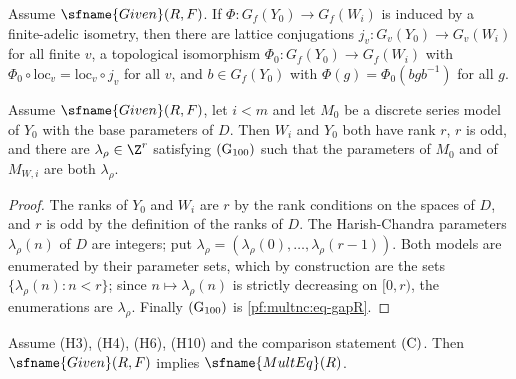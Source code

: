 \begin{lemma}\label{pf:multnc:localiso}
Assume $\sfname{Given}(R,F)$. If $\Phi\colon G_f(Y_0)\to G_f(W_i)$ is induced by a finite-adelic isometry, then there are
lattice conjugations $j_v\colon G_v(Y_0)\to G_v(W_i)$ for all finite $v$, a topological isomorphism
$\Phi_0\colon G_f(Y_0)\to G_f(W_i)$ with $\Phi_0\circ\mathrm{loc}_v=\mathrm{loc}_v\circ j_v$ for all $v$, and $b\in
G_f(Y_0)$ with $\Phi(g)=\Phi_0(bgb^{-1})$ for all $g$.
\end{lemma}

\begin{lemma}\label{pf:multnc:params}
Assume $\sfname{Given}(R,F)$, let $i<m$ and let $M_0$ be a discrete series model of $Y_0$ with the base parameters of $D$.
Then $W_i$ and $Y_0$ both have rank $r$, $r$ is odd, and there are $\lambda_\rho\in\Z^r$ satisfying
$\textup{(G$_{100}$)}$ such that the parameters of $M_0$ and of $M_{W,i}$ are both $\lambda_\rho$.
\end{lemma}

\begin{proof}
The ranks of $Y_0$ and $W_i$ are $r$ by the rank conditions on the spaces of $D$, and $r$ is odd by the definition of the
ranks of $D$. The Harish-Chandra parameters $\lambda_\rho(n)$ of $D$ are integers; put
$\lambda_\rho=(\lambda_\rho(0),\dots,\lambda_\rho(r-1))$. Both models are enumerated by their parameter sets, which by
construction are the sets $\{\lambda_\rho(n):n<r\}$; since $n\mapsto\lambda_\rho(n)$ is strictly decreasing on $[0,r)$,
the enumerations are $\lambda_\rho$. Finally $\textup{(G$_{100}$)}$ is \eqref{pf:multnc:eq-gapR}.
\end{proof}

\begin{proposition}\label{pf:multnc:multeq-of-trcusp}
Assume (H3), (H4), (H6), (H10) and the comparison statement $\textup{(C)}$. Then $\sfname{Given}(R,F)$ implies
$\sfname{MultEq}(R)$.
\end{proposition}


